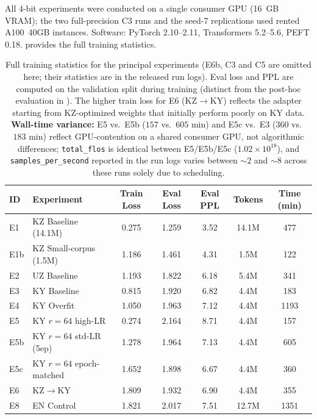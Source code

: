 \documentclass[11pt]{article}
\begin{document}
All 4-bit experiments were conducted on a single consumer GPU (16~GB VRAM); the two full-precision C3 runs and the seed-7 replications used rented A100~40GB instances. Software: PyTorch 2.10--2.11, Transformers 5.2--5.6, PEFT 0.18.  provides the full training statistics.

\begin{table}[!htbp]
\centering
\small
\begin{tabular}{llccccc}
\toprule
\textbf{ID} & \textbf{Experiment} & \textbf{Train Loss} & \textbf{Eval Loss} & \textbf{Eval PPL} & \textbf{Tokens} & \textbf{Time (min)} \\
\midrule
E1 & KZ Baseline (14.1M) & 0.275 & 1.259 & 3.52 & 14.1M & 477 \\
E1b & KZ Small-corpus (1.5M) & 1.186 & 1.461 & 4.31 & 1.5M & 122 \\
E2 & UZ Baseline & 1.193 & 1.822 & 6.18 & 5.4M & 341 \\
E3 & KY Baseline & 0.815 & 1.920 & 6.82 & 4.4M & 183 \\
E4 & KY Overfit & 1.050 & 1.963 & 7.12 & 4.4M & 1193 \\
E5 & KY $r{=}64$ high-LR & 0.274 & 2.164 & 8.71 & 4.4M & 157 \\
E5b & KY $r{=}64$ std-LR (5ep) & 1.278 & 1.964 & 7.13 & 4.4M & 605 \\
E5c & KY $r{=}64$ epoch-matched & 1.652 & 1.898 & 6.67 & 4.4M & 360 \\
E6 & KZ$\rightarrow$KY & 1.809 & 1.932 & 6.90 & 4.4M & 355 \\
E8 & EN Control & 1.821 & 2.017 & 7.51 & 12.7M & 1351 \\
\bottomrule
\end{tabular}
\caption{Full training statistics for the principal experiments (E6b, C3 and C5 are omitted here; their statistics are in the released run logs). Eval loss and PPL are computed on the validation split during training (distinct from the post-hoc evaluation in ). The higher train loss for E6 (KZ$\rightarrow$KY) reflects the adapter starting from KZ-optimized weights that initially perform poorly on KY data. \textbf{Wall-time variance:} E5 vs.\ E5b ($157$ vs.\ $605$ min) and E5c vs.\ E3 ($360$ vs.\ $183$ min) reflect GPU-contention on a shared consumer GPU, not algorithmic differences; \texttt{total\_flos} is identical between E5/E5b/E5c ($1.02{\times}10^{18}$), and \texttt{samples\_per\_second} reported in the run logs varies between $\sim 2$ and $\sim 8$ across these runs solely due to scheduling.}
\label{tab:training_details}
\end{table}
\end{document}
